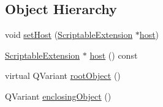 \subsection*{\-Object \-Hierarchy}
\begin{DoxyCompactItemize}
\item 
void \hyperlink{classKParts_1_1ScriptableExtension_ac643fa084835c8fc07abd9072c1a079c}{set\-Host} (\hyperlink{classKParts_1_1ScriptableExtension}{\-Scriptable\-Extension} $\ast$\hyperlink{classKParts_1_1ScriptableExtension_a6505327b97b84ba5d5bae54664ee3ba6}{host})
\item 
\hyperlink{classKParts_1_1ScriptableExtension}{\-Scriptable\-Extension} $\ast$ \hyperlink{classKParts_1_1ScriptableExtension_a6505327b97b84ba5d5bae54664ee3ba6}{host} () const 
\item 
virtual \-Q\-Variant \hyperlink{classKParts_1_1ScriptableExtension_a2e74d0dce5db4528968dc545a73e22d6}{root\-Object} ()
\item 
\-Q\-Variant \hyperlink{classKParts_1_1ScriptableExtension_a1654d1f14b8f3184c4a2c4e382826aee}{enclosing\-Object} ()
\end{DoxyCompactItemize}

